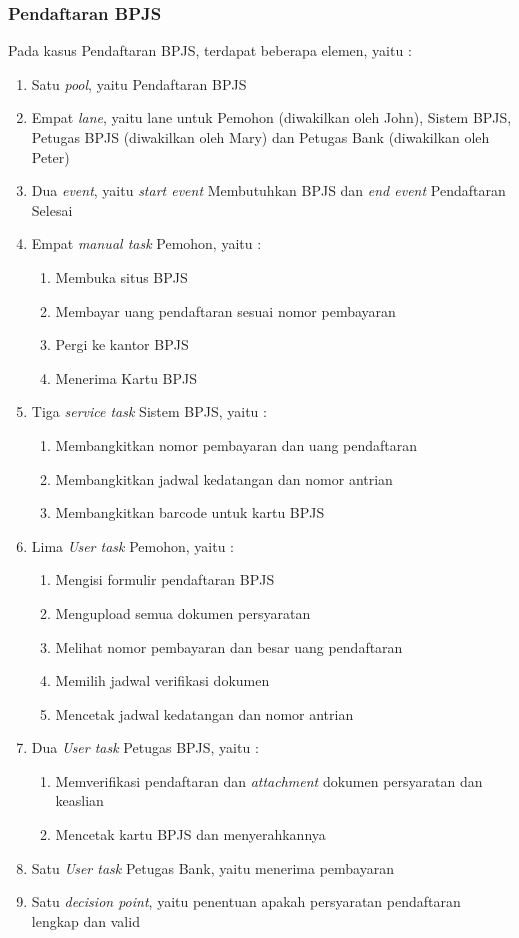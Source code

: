 \subsubsection{Pendaftaran BPJS}
Pada kasus Pendaftaran BPJS, terdapat beberapa elemen, yaitu :
\begin{enumerate}
	\item Satu \textit{pool}, yaitu Pendaftaran BPJS
	\item Empat \textit{lane}, yaitu lane untuk Pemohon (diwakilkan oleh John), Sistem BPJS, Petugas BPJS (diwakilkan oleh Mary) dan Petugas Bank (diwakilkan oleh Peter)
	\item Dua \textit{event}, yaitu \textit{start event} Membutuhkan BPJS dan \textit{end event} Pendaftaran Selesai
	\item Empat \textit{manual task} Pemohon, yaitu : 
			\begin{enumerate}
				\item Membuka situs BPJS
				\item Membayar uang pendaftaran sesuai nomor pembayaran
				\item Pergi ke kantor BPJS
				\item Menerima Kartu BPJS
			\end{enumerate}
	\item Tiga \textit{service task} Sistem BPJS, yaitu :
			\begin{enumerate}
				\item Membangkitkan nomor pembayaran dan uang pendaftaran
				\item Membangkitkan jadwal kedatangan dan nomor antrian
				\item Membangkitkan barcode untuk kartu BPJS
			\end{enumerate}
	\item Lima \textit{User task} Pemohon, yaitu :
			\begin{enumerate}
				\item Mengisi formulir pendaftaran BPJS
				\item Mengupload semua dokumen persyaratan
				\item Melihat nomor pembayaran dan besar uang pendaftaran 
				\item Memilih jadwal verifikasi dokumen
				\item Mencetak jadwal kedatangan dan nomor antrian
			\end{enumerate}
	\item Dua \textit{User task} Petugas BPJS, yaitu :
			\begin{enumerate}
				\item Memverifikasi pendaftaran dan \textit{attachment} dokumen persyaratan dan keaslian
				\item Mencetak kartu BPJS dan menyerahkannya
			\end{enumerate}
	\item Satu \textit{User task} Petugas Bank, yaitu menerima pembayaran
	\item Satu \textit{decision point}, yaitu penentuan apakah persyaratan pendaftaran lengkap dan valid
\end{enumerate}


